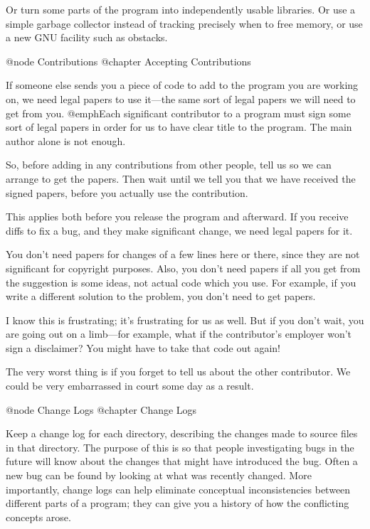 Or turn some parts of the program into independently usable libraries.
Or use a simple garbage collector instead of tracking precisely when
to free memory, or use a new GNU facility such as obstacks.


@node Contributions
@chapter Accepting Contributions

If someone else sends you a piece of code to add to the program you are
working on, we need legal papers to use it---the same sort of legal
papers we will need to get from you.  @emph{Each} significant
contributor to a program must sign some sort of legal papers in order
for us to have clear title to the program.  The main author alone is not
enough.

So, before adding in any contributions from other people, tell us
so we can arrange to get the papers.  Then wait until we tell you
that we have received the signed papers, before you actually use the
contribution.

This applies both before you release the program and afterward.  If
you receive diffs to fix a bug, and they make significant change, we
need legal papers for it.

You don't need papers for changes of a few lines here or there, since
they are not significant for copyright purposes.  Also, you don't need
papers if all you get from the suggestion is some ideas, not actual code
which you use.  For example, if you write a different solution to the
problem, you don't need to get papers.

I know this is frustrating; it's frustrating for us as well.  But if
you don't wait, you are going out on a limb---for example, what if the
contributor's employer won't sign a disclaimer?  You might have to take
that code out again!

The very worst thing is if you forget to tell us about the other
contributor.  We could be very embarrassed in court some day as a
result.

@node Change Logs
@chapter Change Logs

Keep a change log for each directory, describing the changes made to
source files in that directory.  The purpose of this is so that people
investigating bugs in the future will know about the changes that
might have introduced the bug.  Often a new bug can be found by
looking at what was recently changed.  More importantly, change logs
can help eliminate conceptual inconsistencies between different parts
of a program; they can give you a history of how the conflicting
concepts arose.

